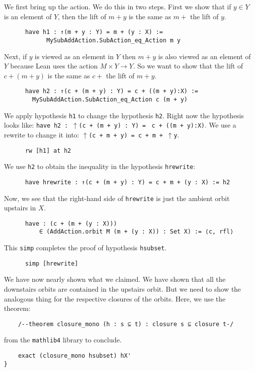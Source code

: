 \documentclass[11pt]{article}
\theoremstyle{definition}              %
\theoremstyle{definition}              %
\theoremstyle{definition}              %
\begin{document}
We first bring up the action. We do this in two steps. First we show that if $y \in Y$ is an element of $Y$, then the lift of $m+y$ is the same as $m+$ the lift of $y$.
\begin{lstlisting}
      have h1 : ↑(m + y : Y) = m + (y : X) :=
            MySubAddAction.SubAction_eq_Action m y
\end{lstlisting}
Next, if $y$ is viewed as an element in $Y$ then $m+y$ is also viewed as an element of $Y$ because Lean uses the action $M \times Y \to Y$. So we want to show that the lift of $c+(m+y)$ is the same as $c+$ the lift of $m+y$.
\begin{lstlisting}
      have h2 : ↑(c + (m + y) : Y) = c + ((m + y):X) :=
        MySubAddAction.SubAction_eq_Action c (m + y)
\end{lstlisting}
We apply hypothesis \verb|h1| to change the hypothesis \verb|h2|. Right now the hypothesis looks like: \verb|have h2 : |$\uparrow$\verb|(c + (m + y) : Y) = | \verb|c + ((m + y):X)|. We use a rewrite to change it into: $\uparrow$\verb|(c + m + y) = c + m + |$\uparrow$\verb|y|.
\begin{lstlisting}
      rw [h1] at h2
\end{lstlisting}
We use \verb|h2| to obtain the inequality in the hypothesis \verb|hrewrite|:
\begin{lstlisting}
      have hrewrite : ↑(c + (m + y) : Y) = c + m + (y : X) := h2
\end{lstlisting}
Now, we see that the right-hand side of \verb|hrewrite| is just the ambient orbit upstairs in $X$.
\begin{lstlisting}
      have : (c + (m + (y : X)))
          ∈ (AddAction.orbit M (m + (y : X)) : Set X) := ⟨c, rfl⟩
\end{lstlisting}
This \verb|simp| completes the proof of hypothesis \verb|hsubset|.
\begin{lstlisting}
      simp [hrewrite]
\end{lstlisting}
We have now nearly shown what we claimed. We have shown that all the downstairs orbits are contained in the upstairs orbit. But we need to show the analogous thing for the respective closures of the orbits. Here, we use the theorem:
\begin{lstlisting}
    /--theorem closure_mono (h : s ⊆ t) : closure s ⊆ closure t-/
\end{lstlisting}
from the \verb|mathlib4| library to conclude.
\begin{lstlisting}
    exact (closure_mono hsubset) hX'
}
\end{lstlisting}
\end{document}
